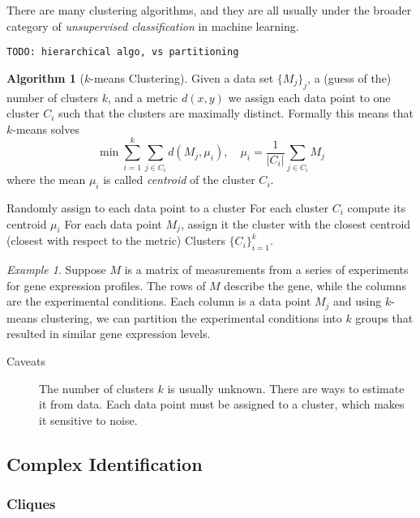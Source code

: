 \documentclass[a4paper]{article}
\newcommand{\todo}[1]{\texttt{TODO: #1}}
\theoremstyle{plain}
\theoremstyle{definition}
\newtheorem{alg}{Algorithm}[section]
\theoremstyle{remark}
\newtheorem*{example}{Example}
\begin{document}
There are many clustering algorithms, and they are all usually under the
broader category of \emph{unsupervised classification} in machine learning.

\todo{hierarchical algo, vs partitioning}

\begin{alg}[$k$-means Clustering]
  Given a data set $\{M_j\}_j$, a (guess of the) number of clusters $k$, and a
  metric $d(x,y)$ we assign each data point to one cluster $C_i$ such that the
  clusters are maximally distinct. Formally this means that $k$-means solves
  \[
    \min \sum_{i=1}^k \sum_{j \in C_i} d(M_j, \mu_i),
    \quad \mu_i = \frac{1}{|C_i|} \sum_{j \in C_i} M_j
  \]
  where the mean $\mu_i$ is called \emph{centroid} of the cluster $C_i$.
  \begin{algorithmic}
      \State Randomly assign to each data point to a cluster
      \Repeat
        \State For each cluster $C_i$ compute its centroid $\mu_i$
        \State For each data point $M_j$, assign it the cluster with the
        closest centroid (closest with respect to the metric)
      \State \Return Clusters $\{C_i\}_{i=1}^k$.
    \EndFunction
  \end{algorithmic}
\end{alg}

\begin{example}
  Suppose $M$ is a matrix of measurements from a series of experiments for
  gene expression profiles. The rows of $M$ describe the gene, while the
  columns are the experimental conditions. Each column is a data point $M_j$
  and using $k$-means clustering, we can partition the experimental conditions
  into $k$ groups that resulted in similar gene expression levels.
\end{example}

\begin{description}
  \item[Caveats] The number of clusters $k$ is usually unknown. There are ways
    to estimate it from data. Each data point must be assigned to a cluster,
    which makes it sensitive to noise.
\end{description}

\subsection{Complex Identification}

\subsubsection{Cliques}
\end{document}

